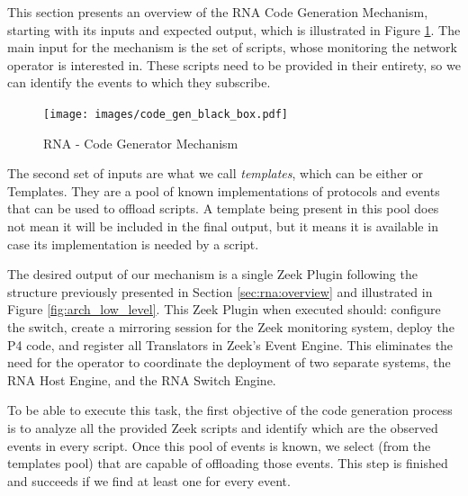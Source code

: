 This section presents an overview of the RNA Code Generation Mechanism, starting with its inputs and expected output, which is illustrated in Figure \ref{fig:code_gen_black_box}. The main input for the mechanism is the set of scripts, whose monitoring the network operator is interested in. These scripts need to be provided in their entirety, so we can identify the events to which they subscribe.

\begin{figure}[htb]
    \caption{RNA - Code Generator Mechanism}
    \begin{center}
        \texttt{[image: images/code\_gen\_black\_box.pdf]}
    \end{center}
    \label{fig:code_gen_black_box}
\end{figure}

The second set of inputs are what we call \textit{templates}, which can be either  \ProtocolTemplates{} or \Offloader{} Templates. They are a pool of known implementations of protocols and events that can be used to offload scripts. A template being present in this pool does not mean it will be included in the final output, but it means it is available in case its implementation is needed by a script.

The desired output of our mechanism is a single Zeek Plugin following the structure previously presented in Section \ref{sec:rna:overview} and illustrated in Figure \ref{fig:arch_low_level}. This Zeek Plugin when executed should: configure the switch, create a mirroring session for the Zeek monitoring system, deploy the P4 code, and register all Translators in Zeek's Event Engine. This eliminates the need for the operator to coordinate the deployment of two separate systems, the RNA Host Engine, and the RNA Switch Engine.

To be able to execute this task, the first objective of the code generation process is to analyze all the provided Zeek scripts and identify which are the observed events in every script. Once this pool of events is known, we select \Offloaders{} (from the templates pool) that are capable of offloading those events. This step is finished and succeeds if we find at least one \Offloader{} for every event.


